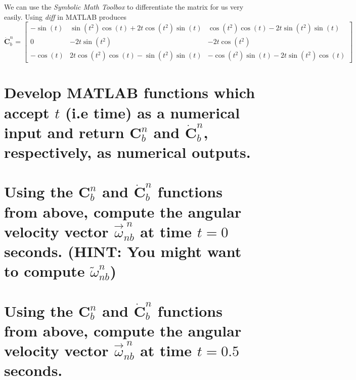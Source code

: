 \documentclass[12pt,letterpaper, onecolumn]{exam}
\begin{document}
\begin{questions}
\begin{parts}
        We can use the \textit{Symbolic Math Toolbox} to differentiate the matrix for us very easily. Using \textit{diff} in MATLAB produces
        \[ \dot{\mathbf{C}}^n_b = \left[\begin{array}{ccc} -\sin\left(t\right) & \sin\left(t^2\right)\cos\left(t\right)+2t\cos\left(t^2\right)\sin\left(t\right) & \cos\left(t^2\right)\cos\left(t\right)-2t\sin\left(t^2\right)\sin\left(t\right)\\ 0 & -2t\sin\left(t^2\right) & -2t\cos\left(t^2\right)\\ -\cos\left(t\right) & 2t\cos\left(t^2\right)\cos\left(t\right)-\sin\left(t^2\right)\sin\left(t\right) & -\cos\left(t^2\right)\sin\left(t\right)-2t\sin\left(t^2\right)\cos\left(t\right) \end{array}\right]\]



        \part{Develop MATLAB functions which accept $t$ (i.e time) as a numerical input and return $\mathbf{C}^n_b$ and $\dot{\mathbf{C}}^n_b$, respectively, as numerical outputs.}


        \part{Using the $\mathbf{C}^n_b$ and $\dot{\mathbf{C}}^n_b$ functions from above, compute the angular velocity vector $\vec{\omega}^{\;n}_{nb}$ at time $t = 0$ seconds. (HINT: You might want to compute $\tilde{\omega}^{n}_{nb}$)}

        \begin{subparts}

        \end{subparts}

        \part{Using the $\mathbf{C}^n_b$ and $\dot{\mathbf{C}}^n_b$ functions from above, compute the angular velocity vector $\vec{\omega}^{\;n}_{nb}$ at time $t = 0.5$ seconds.}
        \begin{subparts}


\end{subparts}
\end{parts}
\end{questions}
\end{document}
